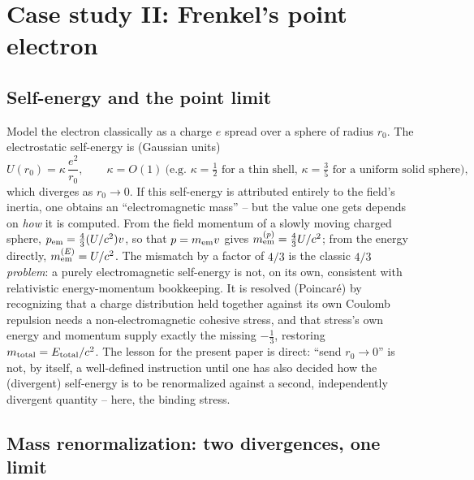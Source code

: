 \documentclass[11pt]{article}
\begin{document}
\section{Case study II: Frenkel's point electron}

\subsection{Self-energy and the point limit}

Model the electron classically as a charge $e$ spread over a sphere of radius $r_0$. The electrostatic self-energy is (Gaussian units)
\begin{equation}
U(r_0) = \kappa\,\frac{e^2}{r_0}, \qquad \kappa = O(1)\ \text{(e.g.\ } \kappa=\tfrac12\text{ for a thin shell, }\kappa=\tfrac35\text{ for a uniform solid sphere)},
\end{equation}
which diverges as $r_0\to0$. If this self-energy is attributed entirely to the field's inertia, one obtains an ``electromagnetic mass'' -- but the value one gets depends on \emph{how} it is computed. From the field momentum of a slowly moving charged sphere, $p_{\rm em}=\tfrac{4}{3}(U/c^2)v$, so that $p=m_{\rm em}v$ gives $m_{\rm em}^{(p)}=\tfrac{4}{3}U/c^2$; from the energy directly, $m_{\rm em}^{(E)}=U/c^2$. The mismatch by a factor of $4/3$ is the classic \emph{$4/3$ problem}: a purely electromagnetic self-energy is not, on its own, consistent with relativistic energy-momentum bookkeeping. It is resolved (Poincar\'e) by recognizing that a charge distribution held together against its own Coulomb repulsion needs a non-electromagnetic cohesive stress, and that stress's own energy and momentum supply exactly the missing $-\tfrac13$, restoring $m_{\rm total}=E_{\rm total}/c^2$. The lesson for the present paper is direct: ``send $r_0\to0$'' is not, by itself, a well-defined instruction until one has also decided how the (divergent) self-energy is to be renormalized against a second, independently divergent quantity -- here, the binding stress.

\subsection{Mass renormalization: two divergences, one limit}
\end{document}

